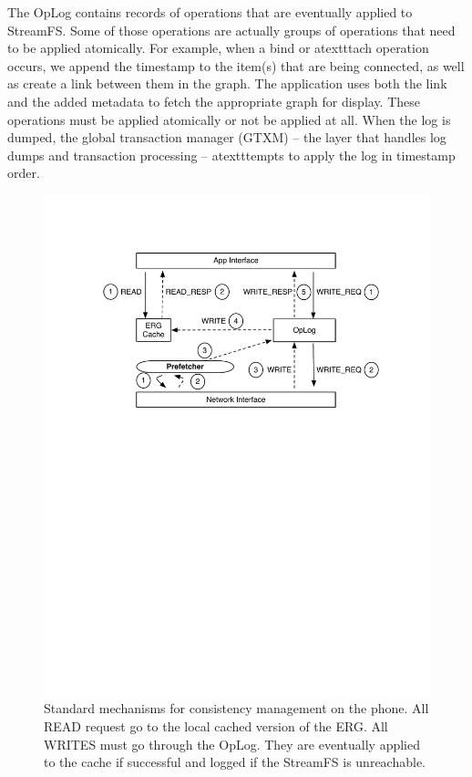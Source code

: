The OpLog contains records of operations that are eventually applied to StreamFS.  Some of those operations
are actually groups of operations that need to be applied atomically.  For example, 
when a bind or atextttach operation occurs, we append the timestamp to the item(s) that are being connected, as well as create
a link between them in the graph.  The application uses both the link and the added metadata to fetch the appropriate
graph for display.  These operations must be applied atomically or not be applied at all.
When the log is dumped, the global transaction manager (GTXM) -- the layer that handles log dumps and transaction processing --
atextttempts to apply the log in timestamp order.


\begin{figure}[htb!]
\begin{center}
\includegraphics[scale=0.50]{figs/standard_interaction}
\caption{Standard mechanisms for consistency management on the phone.  All READ request go to the local
cached version of the ERG.  All WRITES must go through the OpLog.
They are eventually applied to the cache
if successful and logged if the StreamFS is unreachable.}
\label{fig:interactions}
\end{center}
\end{figure}


